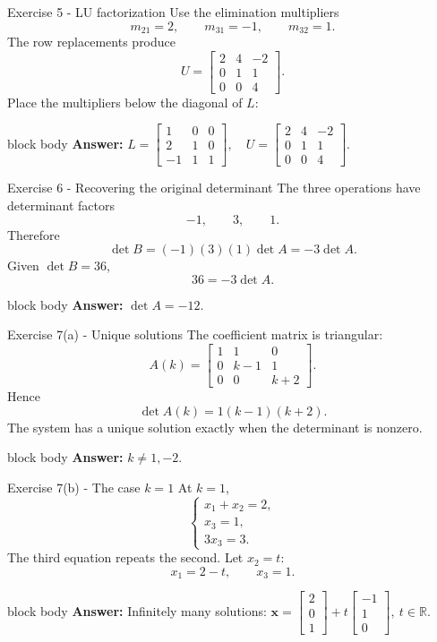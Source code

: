 \documentclass[aspectratio=169]{beamer}
\newcommand{\R}{\mathbb{R}}
\newcommand{\vect}[1]{\mathbf{#1}}
\newcommand{\answerbox}[1]{%
  \begin{beamercolorbox}[sep=1.0ex,wd=\linewidth]{block body}
    \textbf{Answer:} #1
  \end{beamercolorbox}}
\begin{document}
\begin{frame}{Exercise 5 - LU factorization}
Use the elimination multipliers
\[
m_{21}=2,
\qquad
m_{31}=-1,
\qquad
m_{32}=1.
\]
The row replacements produce
\[
U=\begin{bmatrix}
2&4&-2\\
0&1&1\\
0&0&4
\end{bmatrix}.
\]
Place the multipliers below the diagonal of $L$:
\answerbox{$\displaystyle
\boxed{L=\begin{bmatrix}1&0&0\\2&1&0\\-1&1&1\end{bmatrix},
\quad
U=\begin{bmatrix}2&4&-2\\0&1&1\\0&0&4\end{bmatrix}}$.}
\end{frame}

\begin{frame}{Exercise 6 - Recovering the original determinant}
The three operations have determinant factors
\[
-1,
\qquad
3,
\qquad
1.
\]
Therefore
\[
\det B=(-1)(3)(1)\det A=-3\det A.
\]
Given $\det B=36$,
\[
36=-3\det A.
\]
\answerbox{$\boxed{\det A=-12}$.}
\end{frame}

\begin{frame}{Exercise 7(a) - Unique solutions}
The coefficient matrix is triangular:
\[
A(k)=\begin{bmatrix}
1&1&0\\
0&k-1&1\\
0&0&k+2
\end{bmatrix}.
\]
Hence
\[
\det A(k)=1(k-1)(k+2).
\]
The system has a unique solution exactly when the determinant is nonzero.
\answerbox{$\boxed{k\ne1,-2}$.}
\end{frame}

\begin{frame}{Exercise 7(b) - The case \texorpdfstring{$k=1$}{k=1}}
At $k=1$,
\[
\begin{cases}
x_1+x_2=2,\\
x_3=1,\\
3x_3=3.
\end{cases}
\]
The third equation repeats the second. Let $x_2=t$:
\[
x_1=2-t,
\qquad
x_3=1.
\]
\answerbox{Infinitely many solutions:
$\displaystyle \boxed{\vect x=\begin{bmatrix}2\\0\\1\end{bmatrix}
+t\begin{bmatrix}-1\\1\\0\end{bmatrix},\ t\in\R}$.}
\end{frame}
\end{document}
